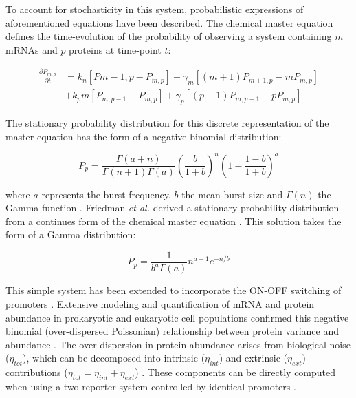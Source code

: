 \onehalfspacing
\noindent To account for stochasticity in this system, probabilistic expressions of aforementioned equations have been described. The chemical master equation defines the time-evolution of the probability of observing a system containing $m$ mRNAs and $p$ proteins at time-point $t$:

\begin{align}
\frac{\partial{}P_{m,p}}{\partial{}t}&=k_n\left[P{m-1,p}-P_{m,p}\right]+\gamma_m\left[(m+1)P_{m+1,p}-mP_{m,p}\right] \nonumber \\
&+k_pm\left[P_{m,p-1}-P_{m,p}\right]+\gamma_p\left[(p+1)P_{m,p+1}-pP_{m,p}\right]
\end{align}

\noindent The stationary probability distribution for this discrete representation of the master equation has the form of a negative-binomial distribution:

\begin{equation}
P_p=\frac{\Gamma(a+n)}{\Gamma(n+1)\Gamma(a)}\left(\frac{b}{1+b}\right)^n\left(1-\frac{1-b}{1+b}\right)^a
\end{equation}

\noindent where $a$ represents the burst frequency, $b$ the mean burst size and $\Gamma(n)$ the Gamma function \citep{Shahrezaei2008}. Friedman \textit{et al.} derived a stationary probability distribution from a continues form of the chemical master equation \citep{Friedman2006}. This solution takes the form of a Gamma distribution:

\begin{equation}
P_p=\frac{1}{b^a\Gamma(a)}n^{a-1} e^{-n/b}
\end{equation}

\noindent This simple system has been extended to incorporate the ON-OFF switching of promoters \citep{Jones2014, Shahrezaei2008}. Extensive modeling and quantification of mRNA and protein abundance in prokaryotic and eukaryotic cell populations confirmed this negative binomial (over-dispersed Poissonian) relationship between protein variance and abundance \citep{Ozbudak2002, Bar-Even2006}. The over-dispersion in protein abundance arises from biological noise ($\eta_{tot}$), which can be decomposed into intrinsic ($\eta_{int}$) and extrinsic ($\eta_{ext}$) contributions ($\eta_{tot}=\eta_{int}+\eta_{ext}$) \citep{Swain2002, Fu2016}. These components can be directly computed when using a two reporter system controlled by identical promoters \citep{Elowitz2002}. \\

